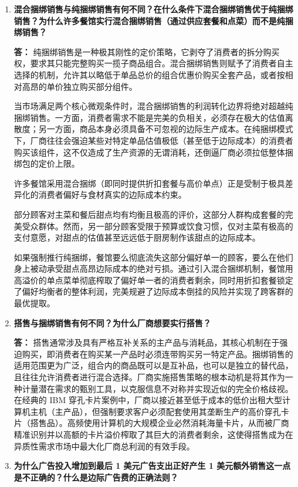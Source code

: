 \begin{enumerate}[label=\textbf{\arabic*.}, leftmargin=*]
		\item \textbf{混合捆绑销售与纯捆绑销售有何不同？在什么条件下混合捆绑销售优于纯捆绑销售？为什么许多餐馆实行混合捆绑销售（通过供应套餐和点菜）而不是纯捆绑销售？}
		
		\textbf{答：}
		纯捆绑销售是一种极其刚性的定价策略，它剥夺了消费者的拆分购买权，要求其只能完整购买一揽子商品组合。混合捆绑销售则赋予了消费者自主选择的机制，允许其以略低于单品总价的组合优惠价购买全套产品，或者按相对高昂的单价独立购买部分组件。
		
		当市场满足两个核心微观条件时，混合捆绑销售的利润转化边界将绝对超越纯捆绑销售。一方面，消费者需求不能是完美的负相关，必须存在极大的估值离散度；另一方面，商品本身必须具备不可忽视的边际生产成本。在纯捆绑模式下，厂商往往会强迫某些对特定单品估值极低（甚至低于边际成本）的消费者购买该组件，这不仅造成了生产资源的无谓消耗，还倒逼厂商必须拉低整体捆绑包的定价上限。
		
		许多餐馆采用混合捆绑（即同时提供折扣套餐与高价单点）正是受制于极具差异化的消费者偏好与食材真实的边际成本约束。
		
		部分顾客对主菜和餐后甜点均有均衡且极高的评价，这部分人群构成套餐的完美受众群体。然而，另一部分顾客受限于预算或饮食习惯，仅对主菜有极高的支付意愿，对甜点的估值甚至远远低于厨房制作该甜点的边际成本。
		
		如果强制推行纯捆绑，餐馆要么彻底流失这部分偏好单一的顾客，要么在他们身上被动承受甜点高昂边际成本的绝对亏损。通过引入混合捆绑机制，餐馆用高溢价的单点菜单彻底榨取了偏好单一者的消费者剩余，同时用折扣套餐锁定了偏好均衡者的整体利润，完美规避了边际成本倒挂的风险并实现了跨客群的最优提取。
		
		\item \textbf{搭售与捆绑销售有何不同？为什么厂商想要实行搭售？}
		
		\textbf{答：}
		搭售通常涉及具有严格互补关系的主产品与消耗品，其核心机制在于强迫购买，即消费者在购买某一产品时必须连带购买另一特定产品。捆绑销售的适用范围更为广泛，组合内的商品既可以是互补品，也可以是独立的替代品，且往往允许消费者进行混合选择。厂商实施搭售策略的根本动机是将其作为一种计量潜在需求的甄别工具，以克服信息不对称并实现近似的完全价格歧视。在经典的 IBM 穿孔卡片案例中，厂商以接近甚至低于成本的低价出租大型计算机主机（主产品），但强制要求客户必须配套使用其垄断生产的高价穿孔卡片（搭售品）。高频使用计算机的大规模企业必然消耗海量卡片，从而被厂商精准识别并以高额的卡片溢价榨取了其巨大的消费者剩余，这使得搭售成为在异质性需求市场中最大化厂商总利润的有效手段。
		
		\item \textbf{为什么广告投入增加到最后 1 美元广告支出正好产生 1 美元额外销售这一点是不正确的？什么是边际广告费的正确法则？}
		

\end{enumerate}
